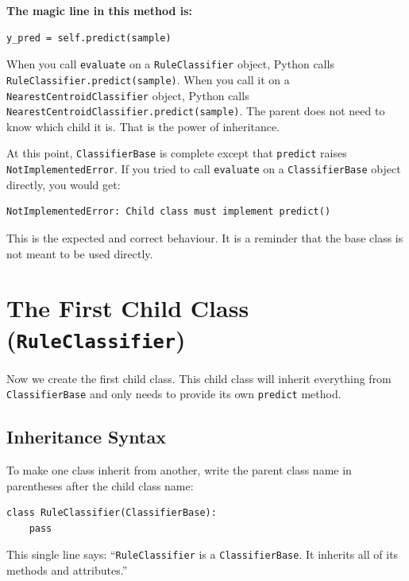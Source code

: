 \noindent
\textbf{The magic line in this method is:}

\begin{verbatim}
y_pred = self.predict(sample)
\end{verbatim}

\noindent
When you call \texttt{evaluate} on a \texttt{RuleClassifier} object, Python calls \texttt{RuleClassifier.predict(sample)}.
When you call it on a \texttt{NearestCentroidClassifier} object, Python calls \texttt{NearestCentroidClassifier.predict(sample)}.
The parent does not need to know which child it is.
That is the power of inheritance.

\begin{tcolorbox}[title=Checkpoint]
At this point, \texttt{ClassifierBase} is complete except that \texttt{predict} raises \texttt{NotImplementedError}.
If you tried to call \texttt{evaluate} on a \texttt{ClassifierBase} object directly, you would get:

\begin{verbatim}
NotImplementedError: Child class must implement predict()
\end{verbatim}

This is the expected and correct behaviour.
It is a reminder that the base class is not meant to be used directly.
\end{tcolorbox}

\section{The First Child Class (\texttt{RuleClassifier})}

Now we create the first child class.
This child class will inherit everything from \texttt{ClassifierBase} and only needs to provide its own \texttt{predict} method.

\subsection{Inheritance Syntax}

To make one class inherit from another, write the parent class name in
parentheses after the child class name:

\begin{verbatim}
class RuleClassifier(ClassifierBase):
    pass
\end{verbatim}

\noindent
This single line says: ``\texttt{RuleClassifier} is a \texttt{ClassifierBase}.
It inherits all of its methods and attributes.''

